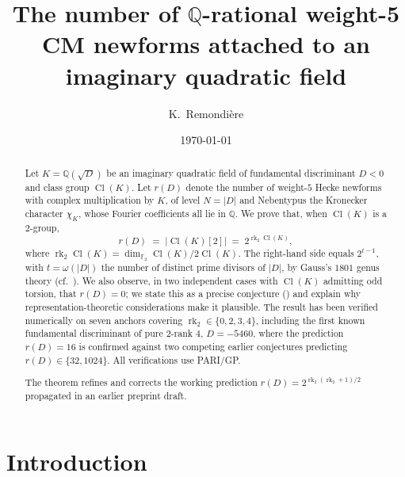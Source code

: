 \documentclass[11pt]{amsart}
\title{The number of \(\mathbb{Q}\)-rational weight-5 CM newforms
attached to an imaginary quadratic field}
\author{K.~Remondi\`ere}
\date{\today}
\theoremstyle{definition}
\theoremstyle{remark}
\DeclareMathOperator{\Cl}{Cl}
\DeclareMathOperator{\rk}{rk}
\newcommand{\Q}{\mathbb{Q}}
\newcommand{\F}{\mathbb{F}}
\newcommand{\chiK}{\chi_K}
\begin{document}
\begin{abstract}
Let \(K = \Q(\sqrt{D})\) be an imaginary quadratic field of fundamental
discriminant \(D < 0\) and class group \(\Cl(K)\). Let
\(r(D)\) denote the number of weight-\(5\) Hecke newforms with complex
multiplication by \(K\), of level \(N = |D|\) and Nebentypus the Kronecker
character \(\chiK\), whose Fourier coefficients all lie in \(\Q\).
We prove that, when \(\Cl(K)\) is a \(2\)-group,
\[
  r(D) \;=\; |\Cl(K)[2]| \;=\; 2^{\rk_2 \Cl(K)} ,
\]
where \(\rk_2 \Cl(K) = \dim_{\F_2} \Cl(K)/2\Cl(K)\). The right-hand side
equals \(2^{t-1}\), with \(t = \omega(|D|)\) the number of distinct
prime divisors of \(|D|\), by Gauss's \(1801\) genus theory
\cite[\S\S 225--237]{Gauss1801} (cf.\ \cite[Theorem~3.15]{Cox1989}). We
also observe, in two independent cases with \(\Cl(K)\) admitting odd
torsion, that \(r(D) = 0\); we state this as a precise conjecture
() and explain why representation-theoretic
considerations make it plausible. The result has been verified
numerically on seven anchors covering
\(\rk_2 \in \{0,2,3,4\}\), including the first known fundamental
discriminant of pure \(2\)-rank \(4\), \(D = -5460\), where the
prediction \(r(D) = 16\) is confirmed against two competing earlier
conjectures predicting \(r(D) \in \{32, 1024\}\). All verifications use
PARI/GP.

The theorem refines and corrects the working
prediction $r(D) = 2^{\rk_2(\rk_2+1)/2}$ propagated in an earlier
preprint draft.
\end{abstract}

\maketitle

\section{Introduction}\label{sec:intro}
\end{document}
